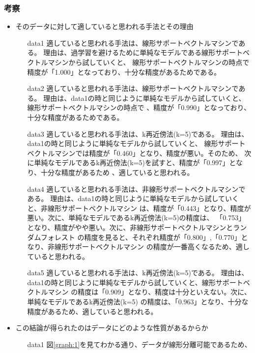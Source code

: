 \subsubsection{考察}
\begin{itemize}
  \item そのデータに対して適していると思われる手法とその理由
  \begin{itemize}
    \item[data1] 適していると思われる手法は、線形サポートベクトルマシンである。
    理由は、過学習を避けるために単純なモデルである線形サポートベクトルマシンから試していくと、
    線形サポートベクトルマシンの時点で精度が「1.000」となっており、十分な精度があるためである。
    \item[data2] 適していると思われる手法は、線形サポートベクトルマシンである。
    理由は、data1の時と同じように単純なモデルから試していくと、線形サポートベクトルマシンの時点で
    、精度が「0.990」となっており、十分な精度があるためである。
    \item[data3] 適していると思われる手法は、k再近傍法(k=5)である。
    理由は、data1の時と同じように単純なモデルから試していくと、
    線形サポートベクトルマシンでは精度が「0.460」となり、精度が悪い。そのため、
    次に単純なモデルであるk再近傍法(k=5)を試すと、精度が「0.997」となり、十分な精度があるため
    、適していると思われる。
    \item[data4] 適していると思われる手法は、非線形サポートベクトルマシンである。
    理由は、data1の時と同じように単純なモデルから試していくと、非線形サポートベクトルマシン
    は、精度が「0.443」となり、精度が悪い。次に、単純なモデルであるk再近傍法(k=5)の精度は、
    「0.753」となり、精度がやや悪い。次に、非線形サポートベクトルマシンとランダムフォレスト
    の精度を見ると、それぞれ精度が「0.800」,「0.770」となり、非線形サポートベクトルマシン
    の精度が一番高くなるため、適していると思われる。
    \item[data5] 適していると思われる手法は、k再近傍法(k=5)である。
    理由は、data1の時と同じように単純なモデルから試していくと、線形サポートベクトルマシン
    の精度は「0.909」となり、精度は十分といえない。次に、単純なモデルであるk再近傍法(k=5)
    の精度は、「0.963」となり、十分な精度があるため、適していると思われる。
  \end{itemize}
  \item この結論が得られたのはデータにどのような性質があるからか
  \begin{itemize}
    \item[data1] 図\ref{graph:1}を見てわかる通り、データが線形分離可能であるため、

\end{itemize}
\end{itemize}
